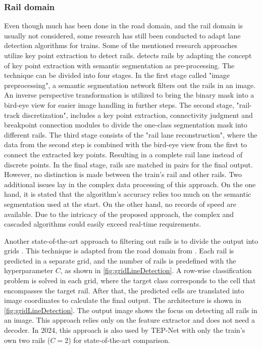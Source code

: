 \subsubsection{Rail domain}

Even though much has been done in the road domain, and the rail domain is usually not considered, some research has still been conducted to adapt lane detection algorithms for trains.
Some of the mentioned research approaches utilize key point extraction to detect rails.
\cite{topologyGuidedRailDetection2022} detects rails by adapting the concept of key point extraction with semantic segmentation as pre-processing.
The technique can be divided into four stages.
In the first stage called "image preprocessing", a semantic segmentation network filters out the rails in an image.
An inverse perspective transformation is utilized to bring the binary mask into a bird-eye view for easier image handling in further steps.
The second stage, "rail-track discretization", includes a key point extraction, connectivity judgment and breakpoint connection modules to divide the one-class segmentation mask into different rails.
The third stage consists of the "rail lane reconstruction", where the data from the second step is combined with the bird-eye view from the first to connect the extracted key points. Resulting in a complete rail lane instead of discrete points.
In the final stage, rails are matched in pairs for the final output.
However, no distinction is made between the train's rail and other rails.
Two additional issues lay in the complex data processing of this approach.
On the one hand, it is stated that the algorithm's accuracy relies too much on the semantic segmentation used at the start.
On the other hand, no records of speed are available.
Due to the intricacy of the proposed approach, the complex and cascaded algorithms could easily exceed real-time requirements.


Another state-of-the-art approach to filtering out rails is to divide the output into grids \cite{li2022rail}.
This technique is adapted from the road domain from \cite{laneDetectionGrid2020}.
Each rail is predicted in a separate grid, and the number of rails is predefined with the hyperparameter $C$, as shown in \autoref{fig:gridLineDetection}.
A row-wise classification problem is solved in each grid, where the target class corresponds to the cell that encompasses the target rail.
After that, the predicted cells are translated into image coordinates to calculate the final output.
The architecture is shown in \autoref{fig:gridLineDetection}.
The output image shows the focus on detecting all rails in an image.
This approach relies only on the feature extractor and does not need a decoder.
In 2024, this approach is also used by TEP-Net \cite{tepNet2024} with only the train's own two rails ($C=2$) for state-of-the-art comparison.


